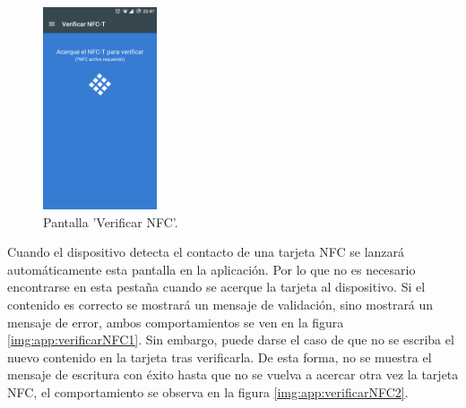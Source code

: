 \documentclass[../PFC.tex]{subfiles}
\begin{document}
\begin{figure}[H]
  \centering
  \includegraphics[width=0.3\textwidth]{./img/app/verificarNFC}
  \caption{Pantalla 'Verificar NFC'.}
  \label{img:app:verificarNFC}
\end{figure}  

Cuando el dispositivo detecta el contacto de una tarjeta NFC se lanzará automáticamente esta pantalla en la aplicación. Por lo que no es necesario encontrarse en esta pestaña cuando se acerque la tarjeta al dispositivo. Si el contenido es correcto se mostrará un mensaje de validación, sino mostrará un mensaje de error, ambos comportamientos se ven en la figura \ref{img:app:verificarNFC1}. Sin embargo, puede darse el caso de que no se escriba el nuevo contenido en la tarjeta tras verificarla. De esta forma, no se muestra el mensaje de escritura con éxito hasta que no se vuelva a acercar otra vez la tarjeta NFC, el comportamiento se observa en la figura \ref{img:app:verificarNFC2}.
%
\end{document}
